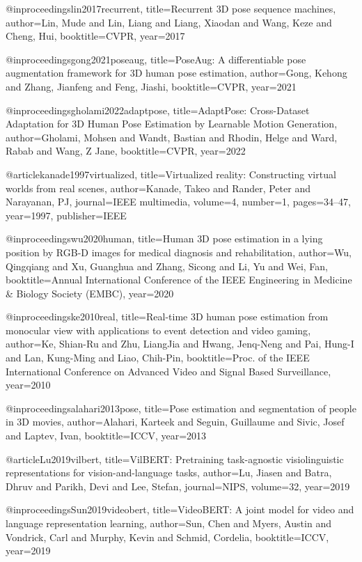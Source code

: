 @inproceedings{lin2017recurrent,
  title={Recurrent {3D} pose sequence machines},
  author={Lin, Mude and Lin, Liang and Liang, Xiaodan and Wang, Keze and Cheng, Hui},
  booktitle=CVPR,
  year={2017}
}

@inproceedings{gong2021poseaug,
  title={Pose{A}ug: A differentiable pose augmentation framework for {3D} human pose estimation},
  author={Gong, Kehong and Zhang, Jianfeng and Feng, Jiashi},
  booktitle=CVPR,
  year={2021}
}

@inproceedings{gholami2022adaptpose,
  title={Adapt{P}ose: Cross-Dataset Adaptation for {3D} Human Pose Estimation by Learnable Motion Generation},
  author={Gholami, Mohsen and Wandt, Bastian and Rhodin, Helge and Ward, Rabab and Wang, Z Jane},
  booktitle=CVPR,
  year={2022}
}

@article{kanade1997virtualized,
  title={Virtualized reality: Constructing virtual worlds from real scenes},
  author={Kanade, Takeo and Rander, Peter and Narayanan, PJ},
  journal={IEEE multimedia},
  volume={4},
  number={1},
  pages={34--47},
  year={1997},
  publisher={IEEE}
}

@inproceedings{wu2020human,
  title={Human {3D} pose estimation in a lying position by RGB-D images for medical diagnosis and rehabilitation},
  author={Wu, Qingqiang and Xu, Guanghua and Zhang, Sicong and Li, Yu and Wei, Fan},
  booktitle={Annual International Conference of the IEEE Engineering in Medicine \& Biology Society (EMBC)},
  year={2020}
}

@inproceedings{ke2010real,
  title={Real-time {3D} human pose estimation from monocular view with applications to event detection and video gaming},
  author={Ke, Shian-Ru and Zhu, LiangJia and Hwang, Jenq-Neng and Pai, Hung-I and Lan, Kung-Ming and Liao, Chih-Pin},
  booktitle={Proc. of the IEEE International Conference on Advanced Video and Signal Based Surveillance},
  year={2010}
}

@inproceedings{alahari2013pose,
  title={Pose estimation and segmentation of people in 3D movies},
  author={Alahari, Karteek and Seguin, Guillaume and Sivic, Josef and Laptev, Ivan},
  booktitle=ICCV,
  year={2013}
}

@article{Lu2019vilbert,
  title={{V}il{BERT}: Pretraining task-agnostic visiolinguistic representations for vision-and-language tasks},
  author={Lu, Jiasen and Batra, Dhruv and Parikh, Devi and Lee, Stefan},
  journal=NIPS,
  volume={32},
  year={2019}
}

@inproceedings{Sun2019videobert,
  title={Video{BERT}: A joint model for video and language representation learning},
  author={Sun, Chen and Myers, Austin and Vondrick, Carl and Murphy, Kevin and Schmid, Cordelia},
  booktitle=ICCV,
  year={2019}
}

